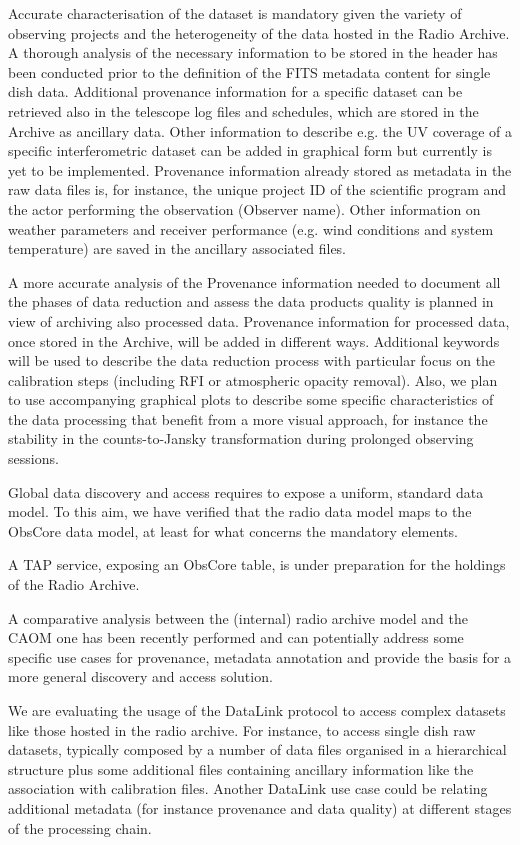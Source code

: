\documentclass[11pt,a4paper]{ivoatex/ivoa}
\begin{document}
{Accurate characterisation of the dataset is mandatory given the variety of observing projects and the 
heterogeneity of the data hosted in the Radio Archive. A thorough analysis of the necessary information 
to be stored in the header has been conducted prior to the definition of the FITS metadata content for 
single dish data. Additional provenance information for a specific dataset can be retrieved also in the 
telescope log files and schedules, which are stored in the Archive as ancillary data. Other information 
to describe e.g. the UV coverage of a specific interferometric dataset can be added in graphical form 
but currently is yet to be implemented. Provenance information already stored as metadata in the raw 
data files is, for instance, the unique project ID of the scientific program and the actor performing 
the observation (Observer name). Other information on weather parameters and receiver performance (e.g. 
wind conditions and system temperature) are saved in the ancillary associated files.

A more accurate analysis of the Provenance information needed to document all the phases of data 
reduction and assess the data products quality is planned in view of archiving also processed data.  
Provenance information for processed data, once stored in the Archive, will be added in different ways. 
Additional keywords will be used to describe the data reduction process with particular focus on the 
calibration steps (including RFI or atmospheric opacity removal). Also, we plan to use accompanying 
graphical plots to describe some specific characteristics of the data processing that benefit from a 
more visual approach, for instance the stability in the counts-to-Jansky transformation during prolonged 
observing sessions.

Global data discovery and access requires to expose a uniform, standard data model. To this aim, we have 
verified that the radio data model maps to the ObsCore data model, at least  for what concerns the 
mandatory elements.

A TAP service, exposing an ObsCore table, is under preparation for the holdings of the Radio Archive.

A comparative analysis between the (internal) radio archive model and the CAOM one has been recently 
performed and can potentially address some specific use cases for provenance, metadata annotation and 
provide the basis for a more general discovery and access solution.

We are evaluating the usage of the DataLink protocol to access complex datasets like those hosted in the 
radio archive. For instance, to access single dish raw datasets, typically composed by a number of data 
files organised in a hierarchical structure plus some additional files containing ancillary information 
like the association with calibration files. Another DataLink use case could be relating additional 
metadata (for instance provenance and data quality) at different stages of the processing chain.

}
\end{document}
